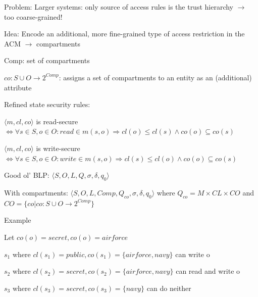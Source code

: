 \documentclass[a4paper]{article}
\begin{document}
\begin{multicols}{3}
    Problem: Larger systems: only source of access rules is the trust hierarchy $\rightarrow$ too coarse-grained!

    Idea: Encode an additional, more fine-grained type of access restriction in the ACM $\rightarrow$ compartments
    \begin{itemize*}
        \item Comp: set of compartments
        \item $co:S\cup O\rightarrow 2^{Comp}$: assigns a set of compartments to an entity as an (additional) attribute
        \item Refined state security rules:
        \begin{itemize*}
            \item $⟨m,cl,co⟩$ is read-secure $\Leftrightarrow\forall s\in S,o\in O:read \in m(s,o)\Rightarrow cl(o)\leq cl(s)\wedge co(o) \subseteq co(s)$
            \item $⟨m,cl,co⟩$ is write-secure $\Leftrightarrow\forall s\in S,o\in O:write\in m(s,o)\Rightarrow cl(s)\leq cl(o)\wedge co(o) \subseteq co(s)$
            \item Good ol’ BLP: $⟨S,O,L,Q,\sigma,\delta,q_0⟩$
            \item With compartments: $⟨S,O,L,Comp,Q_{co},\sigma,\delta,q_0⟩$ where $Q_{co}=M\times CL\times CO$ and $CO=\{co|co:S\cup O\rightarrow 2^{Comp}\}$
        \end{itemize*}
    \end{itemize*}

    Example
    \begin{itemize*}
        \item Let $co(o)=secret,co(o)=airforce$
        \item $s_1$ where $cl(s_1)=public,co(s_1)=\{airforce,navy\}$ can write o
        \item $s_2$ where $cl(s_2)=secret,co(s_2)=\{airforce,navy\}$ can read and write o
        \item $s_3$ where $cl(s_3)=secret,co(s_3)=\{navy\}$ can do neither
        \item %
    \end{itemize*}



\end{multicols}
\end{document}
